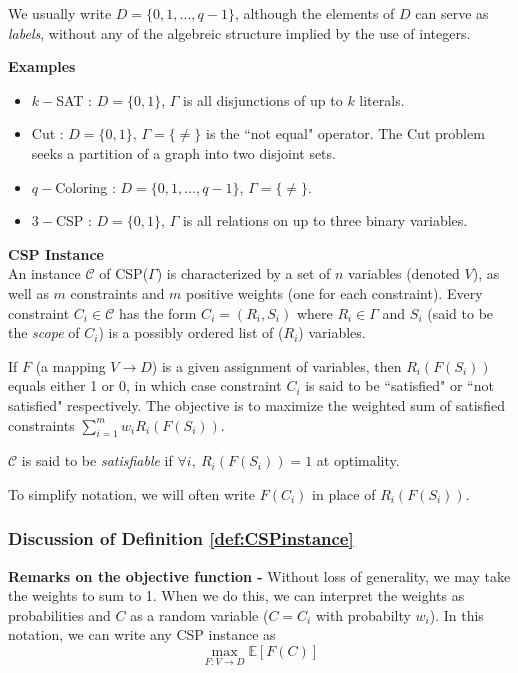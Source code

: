 We usually write $D = \{0,1,\ldots,q-1\}$, although the elements of $D$ can serve as \textit{labels}, without any of the algebreic structure implied by the use of integers.

\textbf{Examples}
\begin{itemize}
\item $k-$SAT : $D = \{0,1\}$, $\Gamma$ is all disjunctions of up to $k$ literals.
\item Cut : $D = \{0,1\}$, $\Gamma = \{\neq\}$ is the ``not equal" operator. The Cut problem seeks a partition of a graph into two disjoint sets.
\item $q-$Coloring : $D = \{0,1,\ldots,q-1\}$, $\Gamma = \{\neq\}$.
\item $3-$CSP : $D = \{0,1\}$, $\Gamma$ is all relations on up to three binary variables.
\end{itemize}

\begin{definition}
\textbf{CSP Instance}\\
An instance $\mathcal{C}$ of CSP($\Gamma$) is characterized by a set of $n$ variables (denoted $V$), as well as $m$ constraints and $m$ positive weights (one for each constraint). 
Every constraint $C_i \in \mathcal{C}$ has the form $C_i = (R_i,S_i)$ where $R_i \in \Gamma$ and $S_i$ (said to be the \textit{scope} of $C_i$) is a possibly ordered list of ($R_i$) variables. 

If $F$ (a mapping $ V\to D$) is a given assignment of variables, then $R_i(F(S_i))$ equals either 1 or 0, in which case constraint $C_i$ is said to be ``satisfied" or ``not satisfied" respectively.
The objective is to maximize the weighted sum of satisfied constraints $\sum_{i = 1}^m w_i R_i(F(S_i))$. 

$\mathcal{C}$ is said to be \textit{satisfiable} if $\forall i, ~ R_i(F(S_i)) = 1$ at optimality.
\label{def:CSPinstance}
\end{definition}

To simplify notation, we will often write $F(C_i)$ in place of $R_i(F(S_i))$.

\subsubsection{Discussion of Definition \ref{def:CSPinstance}}
\textbf{Remarks on the objective function - }Without loss of generality, we may take the weights to sum to 1. 
When we do this, we can interpret the weights as probabilities and $C$ as a random variable ($C = C_i$ with probabilty $w_i$). 
In this notation, we can write any CSP instance as
\begin{equation}
\max_{F: V \to D} \mathbb{E}\left[F(C)\right]
\end{equation}

